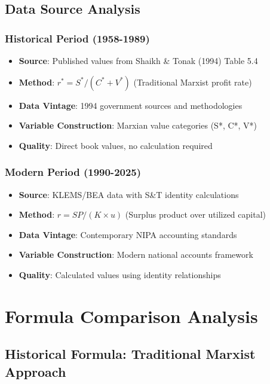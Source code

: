 \documentclass[12pt]{article}
\begin{document}
\subsection{Data Source Analysis}

\subsubsection{Historical Period (1958-1989)}
\begin{itemize}
    \item \textbf{Source}: Published values from Shaikh \& Tonak (1994) Table 5.4
    \item \textbf{Method}: $r^* = S^*/(C^* + V^*)$ (Traditional Marxist profit rate)
    \item \textbf{Data Vintage}: 1994 government sources and methodologies
    \item \textbf{Variable Construction}: Marxian value categories (S*, C*, V*)
    \item \textbf{Quality}: Direct book values, no calculation required
\end{itemize}

\subsubsection{Modern Period (1990-2025)}
\begin{itemize}
    \item \textbf{Source}: KLEMS/BEA data with S\&T identity calculations
    \item \textbf{Method}: $r = SP/(K \times u)$ (Surplus product over utilized capital)
    \item \textbf{Data Vintage}: Contemporary NIPA accounting standards
    \item \textbf{Variable Construction}: Modern national accounts framework
    \item \textbf{Quality}: Calculated values using identity relationships
\end{itemize}

\section{Formula Comparison Analysis}

\subsection{Historical Formula: Traditional Marxist Approach}
\end{document}
